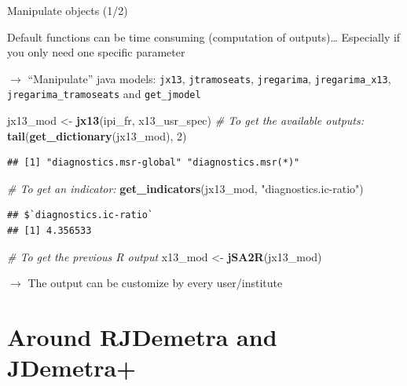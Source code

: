 \documentclass[10pt,xcolor=table,color={dvipsnames,usenames},ignorenonframetext,usepdftitle=false,french]{beamer}
\newenvironment{Shaded}{\begin{snugshade}}{\end{snugshade}}
\newcommand{\CommentTok}[1]{\textcolor[rgb]{0.56,0.35,0.01}{\textit{#1}}}
\newcommand{\DecValTok}[1]{\textcolor[rgb]{0.00,0.00,0.81}{#1}}
\newcommand{\KeywordTok}[1]{\textcolor[rgb]{0.13,0.29,0.53}{\textbf{#1}}}
\newcommand{\NormalTok}[1]{#1}
\newcommand{\StringTok}[1]{\textcolor[rgb]{0.31,0.60,0.02}{#1}}
\begin{document}
\begin{frame}[fragile]{Manipulate \faJava{} objects (1/2)}
\protect\hypertarget{manipulate-objects-12}{}

\footnotesize

Default functions can be time consuming (computation of outputs)\ldots{}
Especially if you only need one specific parameter

\(\rightarrow\) ``Manipulate'' java models: \texttt{jx13},
\texttt{jtramoseats}, \texttt{jregarima}, \texttt{jregarima\_x13},
\texttt{jregarima\_tramoseats} and \texttt{get\_jmodel}

\medskip
\pause

\begin{Shaded}
\begin{Highlighting}[]
\NormalTok{jx13_mod <-}\StringTok{ }\KeywordTok{jx13}\NormalTok{(ipi_fr, x13_usr_spec)}
\CommentTok{# To get the available outputs:}
\KeywordTok{tail}\NormalTok{(}\KeywordTok{get_dictionary}\NormalTok{(jx13_mod), }\DecValTok{2}\NormalTok{)}
\end{Highlighting}
\end{Shaded}

\begin{verbatim}
## [1] "diagnostics.msr-global" "diagnostics.msr(*)"
\end{verbatim}

\begin{Shaded}
\begin{Highlighting}[]
\CommentTok{# To get an indicator:}
\KeywordTok{get_indicators}\NormalTok{(jx13_mod, }\StringTok{"diagnostics.ic-ratio"}\NormalTok{)}
\end{Highlighting}
\end{Shaded}

\begin{verbatim}
## $`diagnostics.ic-ratio`
## [1] 4.356533
\end{verbatim}

\begin{Shaded}
\begin{Highlighting}[]
\CommentTok{# To get the previous R output}
\NormalTok{x13_mod <-}\StringTok{ }\KeywordTok{jSA2R}\NormalTok{(jx13_mod)}
\end{Highlighting}
\end{Shaded}

\(\rightarrow\) The output can be customize by every user/institute

\end{frame}

\hypertarget{around-rjdemetra-and-jdemetra}{%
\section{Around RJDemetra and
JDemetra+}\label{around-rjdemetra-and-jdemetra}}
\end{document}
